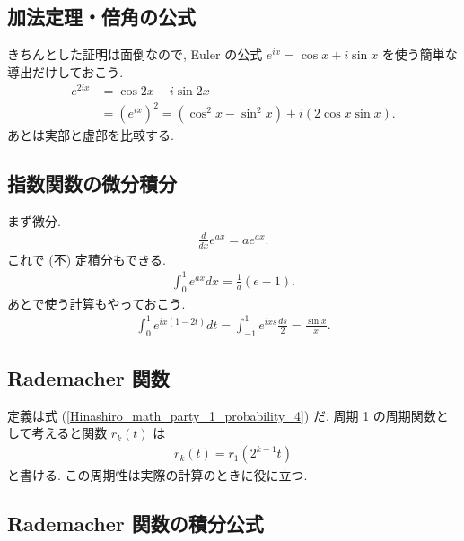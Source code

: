 \documentclass[openany, a4paper, oneside]{book}
\theoremstyle{break}
\theoremstyle{breakdefn}
\newcommand{\rbk}[1]{\left (#1\right)}
\begin{document}
\subsection{加法定理・倍角の公式 \label{Hinashiro_math_party_1_probability_17}}
\label{sec-8-1-2-1}

きちんとした証明は面倒なので, Euler の公式 $e^{ix} = \cos x + i \sin x$ を使う簡単な導出だけしておこう.
\begin{align}
 e^{2 i x}
 &=
 \cos 2x + i \sin 2x \\
 &=
 \rbk{e^{ix}}^2
 =
 \rbk{ \cos^2 x - \sin^2 x} + i \rbk{2 \cos x \sin x}.
\end{align}
あとは実部と虚部を比較する.
\subsection{指数関数の微分積分}
\label{sec-8-1-2-2}

まず微分.
\begin{align}
 \frac{d}{dx} e^{ax} = a e^{ax}.
\end{align}
これで (不) 定積分もできる.
\begin{align}
 \int_0^1 e^{ax} dx = \frac{1}{a} \rbk{e - 1}.
\end{align}
あとで使う計算もやっておこう.
\begin{align}
 \int_0^1 e^{ix (1 - 2t)} dt
 =
 \int_{-1}^{1} e^{ixs} \frac{ds}{2}
 =
 \frac{\sin x}{x}.
\end{align}
\subsection{Rademacher 関数}
\label{sec-8-1-2-3}

定義は式 (\ref{Hinashiro_math_party_1_probability_4}) だ.
周期 1 の周期関数として考えると関数 $r_k (t)$ は
\begin{align}
 r_k (t) = r_1 (2^{k-1} t) \label{Hinashiro_math_party_1_probability_11}
\end{align}
と書ける.
この周期性は実際の計算のときに役に立つ.
\subsection{Rademacher 関数の積分公式 \label{Hinashiro_math_party_1_probability_16}}
\label{sec-8-1-2-4}
\end{document}
